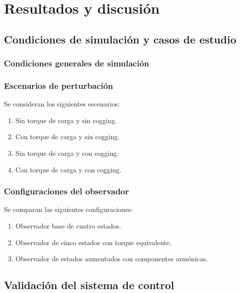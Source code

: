 \chapter{Resultados y discusión}

\section{Condiciones de simulación y casos de estudio}

\subsection{Condiciones generales de simulación}

\subsection{Escenarios de perturbación}

Se consideran los siguientes escenarios:

\begin{enumerate}
    \item Sin torque de carga y sin cogging.
    \item Con torque de carga y sin cogging.
    \item Sin torque de carga y con cogging.
    \item Con torque de carga y con cogging.
\end{enumerate}

\subsection{Configuraciones del observador}

Se comparan las siguientes configuraciones:

\begin{enumerate}
    \item Observador base de cuatro estados.
    \item Observador de cinco estados con torque equivalente.
    \item Observador de estados aumentados con componentes armónicas.
\end{enumerate}


\section{Validación del sistema de control}

